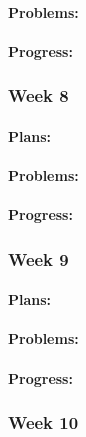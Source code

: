 \documentclass[onecolumn, draftclsnofoot,10pt, compsoc]{article}
\begin{document}
		    \paragraph{Problems:} \hfill \break
		
		    \paragraph{Progress:} \hfill \break
		
		\subsubsection{Week 8}
		
			\paragraph{Plans:} \hfill \break
		
		    \paragraph{Problems:} \hfill \break
		
		    \paragraph{Progress:} \hfill \break
		
		\subsubsection{Week 9}
		
			\paragraph{Plans:} \hfill \break
		
		    \paragraph{Problems:} \hfill \break
		
		    \paragraph{Progress:} \hfill \break
		
		\subsubsection{Week 10}
		
\end{document}
